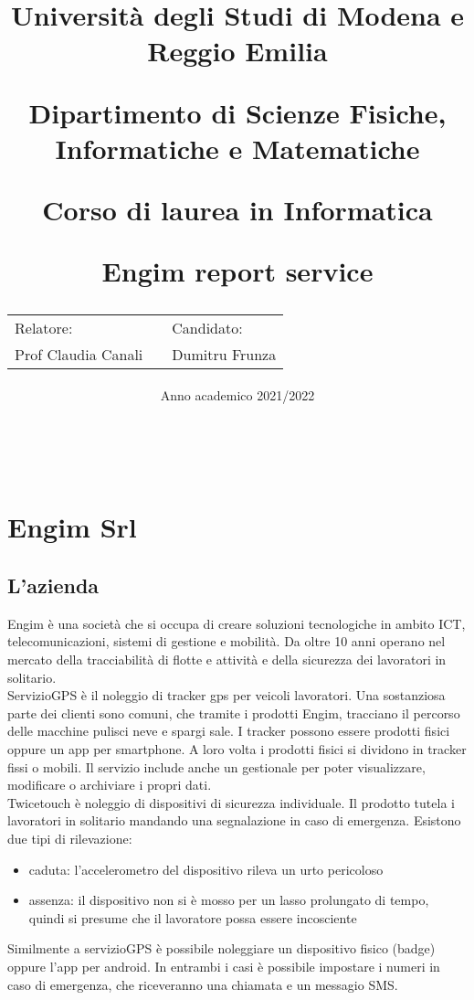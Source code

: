 \documentclass[12pt]{article}
\author{}
\title{
    \huge 
        \textbf{Università degli Studi di Modena e Reggio Emilia}
    \large
        \par Dipartimento di Scienze Fisiche, Informatiche e Matematiche
        \par Corso di laurea in Informatica
    \vfil
        \huge \par \textbf{Engim report service}
    \vfil
    \normalsize
    \begin{tabular}{lp{0.4\textwidth}l}
      Relatore: & & Candidato: \\
      Prof Claudia Canali & &  Dumitru Frunza \\
      \end{tabular}
}
\date{Anno academico 2021/2022}
\begin{document}
\maketitle
\thispagestyle{empty}
\newpage 
\thispagestyle{empty}
\
\newpage
{}
\addtocounter{page}{0}
\tableofcontents
\newpage

\addtocounter{page}{0}
\section{Engim Srl}
\subsection{L'azienda}
Engim è una società che si occupa di creare soluzioni tecnologiche in ambito 
ICT, telecomunicazioni, sistemi di gestione e mobilità. Da oltre 10 anni operano 
nel mercato della tracciabilità di flotte e attività e della 
sicurezza dei lavoratori in solitario.
\\ ServizioGPS è il noleggio di tracker gps per veicoli lavoratori. 
Una sostanziosa parte dei clienti sono comuni, che tramite i prodotti Engim, 
tracciano il percorso delle macchine pulisci neve e spargi sale.
I tracker possono essere prodotti fisici oppure un app per smartphone. A loro 
volta i prodotti fisici si dividono in tracker fissi o mobili. Il servizio include
anche un gestionale per poter visualizzare, modificare o archiviare i propri dati.
\\ Twicetouch è noleggio di dispositivi di sicurezza individuale.
Il prodotto tutela i lavoratori in solitario mandando una segnalazione in caso di
emergenza. Esistono due tipi di rilevazione: 
\begin{itemize}
  \item caduta: l'accelerometro del dispositivo rileva un urto pericoloso
  \item assenza: il dispositivo non si è mosso per un lasso prolungato di tempo, 
  quindi si presume che il lavoratore possa essere incosciente
\end{itemize}
Similmente a servizioGPS è possibile noleggiare un dispositivo fisico (badge) oppure
l'app per android. In entrambi i casi è possibile impostare i numeri in caso di 
emergenza, che riceveranno una chiamata e un messagio SMS.
\end{document}
